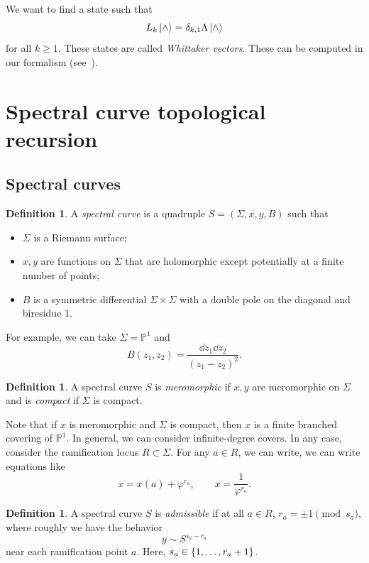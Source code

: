 \documentclass[leqno, openany]{memoir}
\theoremstyle{definition}
\newtheorem{defn}[thm]{Definition}
\theoremstyle{remark}
\theoremstyle{plain}
\theoremstyle{definition}
\theoremstyle{remark}
\renewcommand{\P}{\mathbb{P}}
\begin{document}
We want to find a state such that
\[ L_k \ket{\wedge} = \delta_{k, 1} \Lambda \ket{\wedge} \]
for all $k \geq 1$. These states are called \textit{Whittaker vectors}. These can be computed in our formalism (see~\cite{whittakervectoprec}).


\section{Spectral curve topological recursion}

\subsection{Spectral curves}

\begin{defn}
    A \textit{spectral curve} is a quadruple $S = (\Sigma, x, y, B)$ such that
    \begin{itemize}
        \item $\Sigma$ is a Riemann surface;
        \item $x, y$ are functions on $\Sigma$ that are holomorphic except potentially at a finite number of points;
        \item $B$ is a symmetric differential $\Sigma \times \Sigma$ with a double pole on the diagonal and biresidue $1$.
    \end{itemize}
\end{defn}

For example, we can take $\Sigma = \P^1$ and
\[ B(z_1, z_2) = \frac{\dd{z_1} \dd{z_2}}{(z_1-z_2)^2}. \]

\begin{defn}
    A spectral curve $S$ is \textit{meromorphic} if $x, y$ are meromorphic on $\Sigma$ and is \textit{compact} if $\Sigma$ is compact.
\end{defn}

Note that if $x$ is meromorphic and $\Sigma$ is compact, then $x$ is a finite branched covering of $\P^1$. In general, we can consider infinite-degree covers. In any case, consider the ramification locus $R \subset \Sigma$. For any $a \in R$, we can write, we can write equations like
\[ x = x(a) + \varphi^{r_a}, \qquad x = \frac{1}{\varphi^{r_a}}. \]

\begin{defn}
    A spectral curve $S$ is \textit{admissible} if at all $a \in R$, $r_a = \pm 1 \pmod{s_a}$, where roughly we have the behavior
    \[ y \sim S^{s_a-r_a} \]
    near each ramification point $a$. Here, $s_a \in \qty{1, \ldots, r_a+1}$.
\end{defn}
\end{document}
